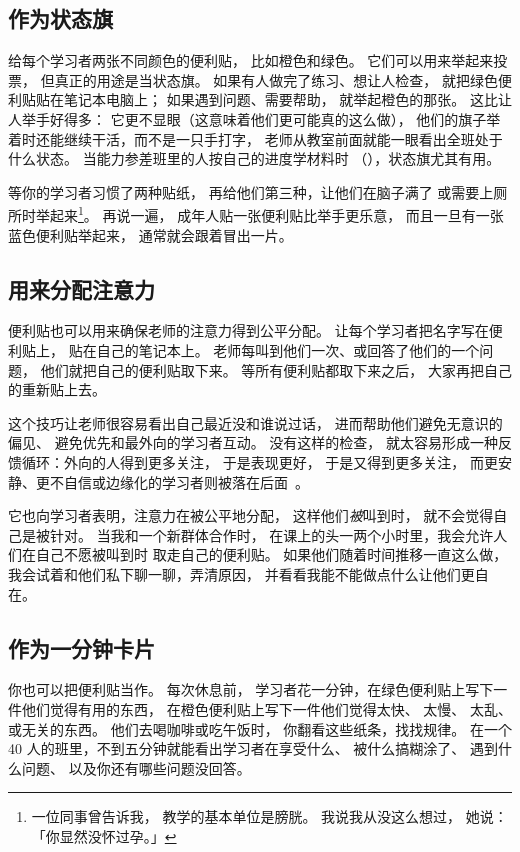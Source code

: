 \subsection*{作为状态旗}

给每个学习者两张不同颜色的便利贴，
比如橙色和绿色。
它们可以用来举起来投票，
但真正的用途是当状态旗。
如果有人做完了练习、想让人检查，
就把绿色便利贴贴在笔记本电脑上；
如果遇到问题、需要帮助，
就举起橙色的那张。
这比让人举手好得多：
它更不显眼（这意味着他们更可能真的这么做），
他们的旗子举着时还能继续干活，而不是一只手打字，
老师从教室前面就能一眼看出全班处于什么状态。
当能力参差班里的人按自己的进度学材料时
（），状态旗尤其有用。

等你的学习者习惯了两种贴纸，
再给他们第三种，让他们在脑子满了
或需要上厕所时举起来\footnote{一位同事曾告诉我，
教学的基本单位是膀胱。
我说我从没这么想过，
她说：「你显然没怀过孕。」}。
再说一遍，
成年人贴一张便利贴比举手更乐意，
而且一旦有一张蓝色便利贴举起来，
通常就会跟着冒出一片。

\subsection*{用来分配注意力}

便利贴也可以用来确保老师的注意力得到公平分配。
让每个学习者把名字写在便利贴上，
贴在自己的笔记本上。
老师每叫到他们一次、或回答了他们的一个问题，
他们就把自己的便利贴取下来。
等所有便利贴都取下来之后，
大家再把自己的重新贴上去。

这个技巧让老师很容易看出自己最近没和谁说过话，
进而帮助他们避免无意识的偏见、
避免优先和最外向的学习者互动。
没有这样的检查，
就太容易形成一种反馈循环：外向的人得到更多关注，
于是表现更好，
于是又得到更多关注，
而更安静、更不自信或边缘化的学习者则被落在后面~\cite{Alvi1999,Juss2005}。

它也向学习者表明，注意力在被公平地分配，
这样他们\emph{被}叫到时，
就不会觉得自己是被针对。
当我和一个新群体合作时，
在课上的头一两个小时里，我会允许人们在自己不愿被叫到时
取走自己的便利贴。
如果他们随着时间推移一直这么做，
我会试着和他们私下聊一聊，弄清原因，
并看看我能不能做点什么让他们更自在。

\subsection*{作为一分钟卡片}

你也可以把便利贴当作。
每次休息前，
学习者花一分钟，在绿色便利贴上写下一件他们觉得有用的东西，
在橙色便利贴上写下一件他们觉得太快、
太慢、
太乱、
或无关的东西。
他们去喝咖啡或吃午饭时，
你翻看这些纸条，找找规律。
在一个 40 人的班里，不到五分钟就能看出学习者在享受什么、
被什么搞糊涂了、
遇到什么问题、
以及你还有哪些问题没回答。

